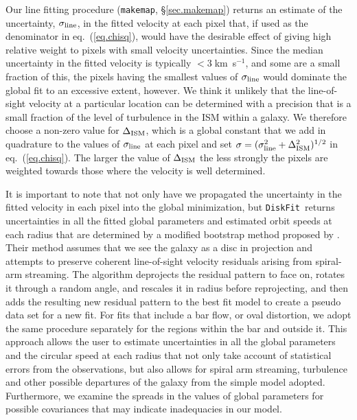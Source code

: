 \documentclass[letterpaper,fleqn,usenatbib]{mnras}
\def\DFt{{\tt DiskFit}}
\def\mkm{{\tt makemap}}
\begin{document}
Our line fitting procedure (\mkm, \S\ref{sec.makemap}) returns an
estimate of the uncertainty, $\sigma_{\rm line}$, in the fitted
velocity at each pixel that, if used as the denominator in
eq.~(\ref{eq.chisq}), would have the desirable effect of giving high
relative weight to pixels with small velocity uncertainties.  Since
the median uncertainty in the fitted velocity is typically $<
3\;$km~s$^{-1}$, and some are a small fraction of this, the pixels
having the smallest values of $\sigma_{\rm line}$ would dominate the
global fit to an excessive extent, however.  We think it unlikely that
the line-of-sight velocity at a particular location can be determined
with a precision that is a small fraction of the level of turbulence
in the ISM within a galaxy.  We therefore choose a non-zero value for
$\Delta_{\rm ISM}$, which is a global constant that we add in
quadrature to the values of $\sigma_{\rm line}$ at each pixel and set
$\sigma = (\sigma_{\rm line}^2 + \Delta_{\rm ISM}^2)^{1/2}$ in
eq.~(\ref{eq.chisq}).  The larger the value of $\Delta_{\rm ISM}$ the
less strongly the pixels are weighted towards those where the velocity
is well determined.

It is important to note that not only have we propagated the
uncertainty in the fitted velocity in each pixel into the global
minimization, but \DFt\ returns uncertainties in all the fitted global
parameters and estimated orbit speeds at each radius that are
determined by a modified bootstrap method proposed by \citet{SZS10}.
Their method assumes that we see the galaxy as a disc in projection
and attempts to preserve coherent line-of-sight velocity residuals
arising from spiral-arm streaming.  The algorithm deprojects the
residual pattern to face on, rotates it through a random angle, and
rescales it in radius before reprojecting, and then adds the resulting
new residual pattern to the best fit model to create a pseudo data set
for a new fit.  For fits that include a bar flow, or oval distortion,
we adopt the same procedure separately for the regions within the bar
and outside it.  This approach allows the user to estimate
uncertainties in all the global parameters and the circular speed at
each radius that not only take account of statistical errors from the
observations, but also allows for spiral arm streaming, turbulence and
other possible departures of the galaxy from the simple model adopted.
Furthermore, we examine the spreads in the values of global parameters
for possible covariances that may indicate inadequacies in our model.
\end{document}
